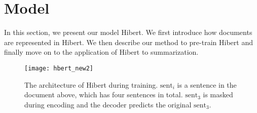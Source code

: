 \documentclass[11pt,a4paper]{article}
\begin{document}
\section{Model}
In this section, we present our model {\sc Hibert}.
We first introduce how documents are represented in {\sc Hibert}. We then describe our method to pre-train {\sc Hibert} and finally move on to the application of {\sc Hibert} to summarization.

\begin{figure}[t]
	\centering
	\texttt{[image: hbert\_new2]}
	\caption{The architecture of {\sc Hibert} during training. $\text{sent}_i$ is a sentence in the document above, which has four sentences in total. $\text{sent}_3$ is masked during encoding and the decoder predicts the original $\text{sent}_3$.}
	\label{fig:hbert}
\end{figure}
\end{document}
